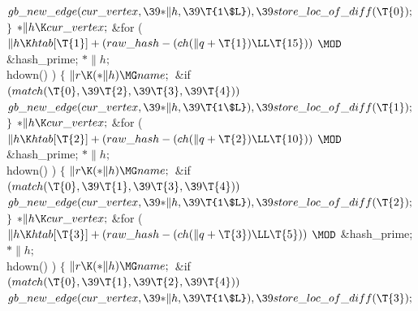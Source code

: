 ${}\\{gb\_new\_edge}(\\{cur\_vertex},\39{*}\|h,\39\T{1\$L}),\39\\{store\_loc%
\_of\_diff}(\T{0});{}$\2\6
\4${}\}{}$\2\6
${}{*}\|h\K\\{cur\_vertex};$ \&{for} ( $\|h\K\\{htab}[\T{1}]+(\\{raw\_hash}-(%
\\{ch}(\|q+\T{1})\LL\T{15}))$ $\MOD$ \&{hash\_prime};\7
${}{*}\|h;$ \\{hdown}() ) \6
${}\{{}$\1\6
${}\|r\K({*}\|h)\MG\\{name};{}$\6
\&{if} ${}(\\{match}(\T{0},\39\T{2},\39\T{3},\39\T{4})){}$\1\5
${}\\{gb\_new\_edge}(\\{cur\_vertex},\39{*}\|h,\39\T{1\$L}),\39\\{store\_loc%
\_of\_diff}(\T{1});{}$\2\6
\4${}\}{}$\2\6
${}{*}\|h\K\\{cur\_vertex};$ \&{for} ( $\|h\K\\{htab}[\T{2}]+(\\{raw\_hash}-(%
\\{ch}(\|q+\T{2})\LL\T{10}))$ $\MOD$ \&{hash\_prime};\7
${}{*}\|h;$ \\{hdown}() ) \6
${}\{{}$\1\6
${}\|r\K({*}\|h)\MG\\{name};{}$\6
\&{if} ${}(\\{match}(\T{0},\39\T{1},\39\T{3},\39\T{4})){}$\1\5
${}\\{gb\_new\_edge}(\\{cur\_vertex},\39{*}\|h,\39\T{1\$L}),\39\\{store\_loc%
\_of\_diff}(\T{2});{}$\2\6
\4${}\}{}$\2\6
${}{*}\|h\K\\{cur\_vertex};$ \&{for} ( $\|h\K\\{htab}[\T{3}]+(\\{raw\_hash}-(%
\\{ch}(\|q+\T{3})\LL\T{5}))$ $\MOD$ \&{hash\_prime};\7
${}{*}\|h;$ \\{hdown}() ) \6
${}\{{}$\1\6
${}\|r\K({*}\|h)\MG\\{name};{}$\6
\&{if} ${}(\\{match}(\T{0},\39\T{1},\39\T{2},\39\T{4})){}$\1\5
${}\\{gb\_new\_edge}(\\{cur\_vertex},\39{*}\|h,\39\T{1\$L}),\39\\{store\_loc%
\_of\_diff}(\T{3});{}$\2\6
